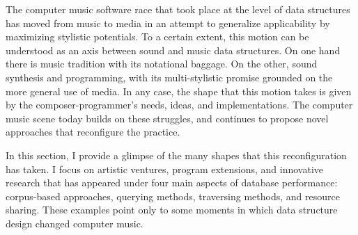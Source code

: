 The computer music software race that took place at the level of data structures has moved from music to media in an attempt to generalize applicability by maximizing stylistic potentials. To a certain extent, this motion can be understood as an axis between sound and music data structures. On one hand there is music tradition with its notational baggage. On the other, sound synthesis and programming, with its multi-stylistic promise grounded on the more general use of media. In any case, the shape that this motion takes is given by the composer-programmer's needs, ideas, and implementations. The computer music scene today builds on these struggles, and continues to propose novel approaches that reconfigure the practice.

In this section, I provide a glimpse of the many shapes that this reconfiguration has taken. I focus on artistic ventures, program extensions, and innovative research that has appeared under four main aspects of database performance: corpus-based approaches, querying methods, traversing methods, and resource sharing. These examples point only to some moments in which data structure design changed computer music.

